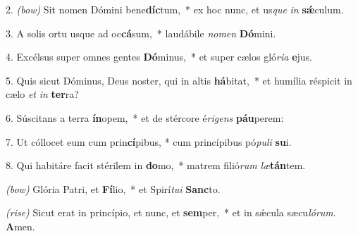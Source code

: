 2. \textit{(bow)} Sit nomen Dómini bene\textbf{díc}tum,~*
	ex hoc nunc, et us\textit{que} \textit{in} \textbf{s\'{\ae}}culum.

3. A solis ortu usque ad oc\textbf{cá}sum,~*
	laudábile \textit{no}\textit{men} \textbf{Dó}mini.

4. Excélsus super omnes gentes \textbf{Dó}minus,~*
	et super cælos gló\textit{ri}\textit{a} \textbf{e}jus.

5. Quis sicut Dóminus, Deus noster, qui in altis \textbf{há}bitat,~*
	et humília réspicit in cælo \textit{et} \textit{in} \textbf{ter}ra?

6. Súscitans a terra \textbf{ín}opem,~*
	et de stércore é\textit{ri}\textit{gens} \textbf{páu}perem:

7. Ut cóllocet eum cum prin\textbf{cí}pibus, *
	cum princípibus pó\textit{pu}\textit{li} \textbf{su}i.

8. Qui habitáre facit stérilem in \textbf{do}mo,~*
	matrem filió\textit{rum} \textit{læ}\textbf{tán}tem.

\textit{(bow)} Glória Patri, et \textbf{Fí}lio,~*
	et Spirí\textit{tu}\textit{i} \textbf{Sanc}to.

\textit{(rise)} Sicut erat in princípio, et nunc, et \textbf{sem}per,~*
	et in s\'{\ae}cula sæcu\textit{ló}\textit{rum}. \textbf{A}men.